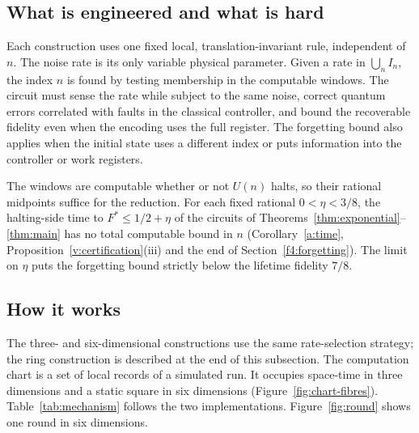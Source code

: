 \subsection{What is engineered and what is hard}\label{intro:nontrivial}
Each construction uses one fixed local, translation-invariant rule, independent of \(n\). The noise rate is its only variable physical parameter. Given a rate in \(\bigcup_n I_n\), the index \(n\) is found by testing membership in the computable windows. The circuit must sense the rate while subject to the same noise, correct quantum errors correlated with faults in the classical controller, and bound the recoverable fidelity even when the encoding uses the full register. The forgetting bound also applies when the initial state uses a different index or puts information into the controller or work registers.

The windows are computable whether or not \(U(n)\) halts, so their rational midpoints suffice for the reduction. For each fixed rational \(0<\eta<3/8\), the halting-side time to \(F^*\le1/2+\eta\) of the circuits of Theorems~\ref{thm:exponential}--\ref{thm:main} has no total computable bound in \(n\) (Corollary~\ref{a:time}, Proposition~\ref{v:certification}(iii) and the end of Section~\ref{f4:forgetting}). The limit on \(\eta\) puts the forgetting bound strictly below the lifetime fidelity \(7/8\).

\subsection{How it works}\label{intro:mechanism}
The three- and six-dimensional constructions use the same rate-selection strategy; the ring construction is described at the end of this subsection. The computation chart is a set of local records of a simulated run. It occupies space-time in three dimensions and a static square in six dimensions (Figure~\ref{fig:chart-fibres}). Table~\ref{tab:mechanism} follows the two implementations. Figure~\ref{fig:round} shows one round in six dimensions.

